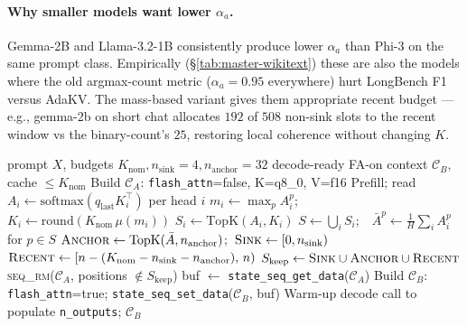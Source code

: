 \documentclass[sigconf, anonymous=false, screen=true]{acmart}
\begin{document}
\paragraph{Why smaller models want lower $\alpha_a$.} Gemma-2B and Llama-3.2-1B consistently produce lower $\alpha_a$ than Phi-3 on the same prompt class. Empirically (\S\ref{tab:master-wikitext}) these are also the models where the old argmax-count metric ($\alpha_a{=}0.95$ everywhere) hurt LongBench F1 versus AdaKV. The mass-based variant gives them appropriate recent budget --- e.g., gemma-2b on short chat allocates $192$ of $508$ non-sink slots to the recent window vs the binary-count's $25$, restoring local coherence without changing $K$.

\begin{algorithm}[t]
\caption{$\mu$KV prefill (controllers the per-head gate, anchor selection, the eviction step)}
\label{alg:prefill}
\begin{algorithmic}[1]
\Require prompt $X$, budgets $K_{\text{nom}}, n_{\text{sink}}{=}4, n_{\text{anchor}}{=}32$
\Ensure decode-ready FA-on context $\mathcal{C}_B$, cache $\le K_{\text{nom}}$
\State Build $\mathcal{C}_A$: \texttt{flash\_attn}=false, K=q8\_0, V=f16
\State Prefill; read $A_i \gets \mathrm{softmax}(q_{\text{last}}K_i^\top)$ per head $i$
  \State $m_i \gets \max_p A_i^p$;\ \ $K_i \gets \mathrm{round}(K_{\text{nom}}\,\mu(m_i))$
  \State $S_i \gets \mathrm{TopK}(A_i, K_i)$ \Comment{$S_i \subset [0,n)$}
\EndFor
\State $S \gets \bigcup_i S_i$;\ \ $\bar A^p \gets \tfrac1H\sum_i A_i^p$ for $p\in S$
\State $\textsc{Anchor}\gets\mathrm{TopK}(\bar A, n_{\text{anchor}})$;\ $\textsc{Sink}\gets[0,n_{\text{sink}})$
\State $\textsc{Recent}\gets[n-(K_{\text{nom}}-n_{\text{sink}}-n_{\text{anchor}}),\,n)$
\State $S_{\text{keep}}\gets\textsc{Sink}\cup\textsc{Anchor}\cup\textsc{Recent}$
\State \textsc{seq\_rm}($\mathcal{C}_A$, positions $\notin S_{\text{keep}}$)
\State buf $\gets$ \texttt{state\_seq\_get\_data}($\mathcal{C}_A$)
\State Build $\mathcal{C}_B$: \texttt{flash\_attn}=true; \texttt{state\_seq\_set\_data}($\mathcal{C}_B$, buf)
\State Warm-up decode call to populate \texttt{n\_outputs}; \Return $\mathcal{C}_B$
\end{algorithmic}
\end{algorithm}
\end{document}
